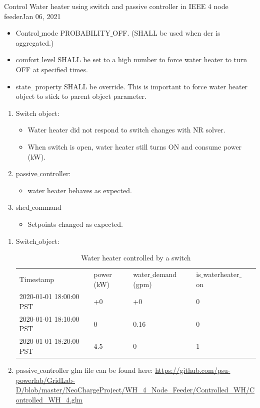 \begin{entry}{Control Water heater using switch and passive controller in IEEE 4 node feeder}{Jan 06, 2021}
\begin{enumerate}
\begin{itemize}
                \item Control$\_$mode PROBABILITY$\_$OFF. (SHALL be used when der is aggregated.)
                \item comfort$\_$level SHALL be set to a high number to force water heater to turn OFF at specified times.
                \item state$\_$ property SHALL be override. This is important to force water heater object to stick to parent object parameter.
            \end{itemize}
    \end{enumerate}
    \observations
    \begin{enumerate}
        \item Switch object:
        \begin{itemize}
            \item Water heater did not respond to switch changes with NR solver.
            \item When switch is open, water heater still turns ON and consume power (kW).
    \end{itemize}
        \item passive$\_$controller:
        \begin{itemize}
            \item water heater behaves as expected.
        \end{itemize}
        \item shed$\_$command
        \begin{itemize}
            \item Setpoints changed as expected.
        \end{itemize}
    \end{enumerate}
\newpage
    
    \data
    \begin{enumerate}
        \item Switch$\_$object:
        
    
\begin{table}[h]
\begin{tabular}{|l|l|l|l|l}

\cline{1-4}
Timestamp & power (kW) & water$\_$demand (gpm) & is$\_$waterheater$\_$on & \\ \cline{1-4}
2020-01-01 18:00:00 PST & +0 & +0 & 0 & \\ \cline{1-4}
2020-01-01 18:10:00 PST & 0 & 0.16 & 0 &  \\ \cline{1-4}
2020-01-01 18:20:00 PST & 4.5 & 0 & 1 &  \\ \cline{1-4}
\end{tabular}
\caption{Water heater controlled by a switch}
\label{table:1}
\end{table}
        \item passive$\_$controller \newline
        glm file can be found here: \url{https://github.com/psu-powerlab/GridLab-D/blob/master/NeoChargeProject/WH_4_Node_Feeder/Controlled_WH/Controlled_WH_4.glm} \newline \par
        

\end{enumerate}
\end{entry}
